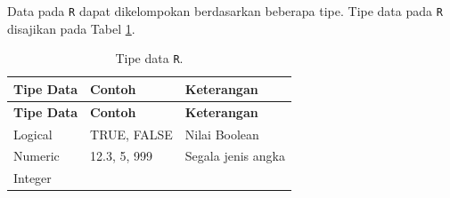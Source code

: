 \documentclass[]{book}
\theoremstyle{definition}
\theoremstyle{definition}
\theoremstyle{definition}
\theoremstyle{remark}
\begin{document}
Data pada \texttt{R} dapat dikelompokan berdasarkan beberapa tipe. Tipe data pada \texttt{R} disajikan pada Tabel \ref{tab:tipedata}.

\begin{longtable}[]{@{}lll@{}}
\caption{\label{tab:tipedata} Tipe data \texttt{R}.}\tabularnewline
\toprule
\begin{minipage}[b]{0.11\columnwidth}\raggedright
\textbf{Tipe Data}\strut
\end{minipage} & \begin{minipage}[b]{0.19\columnwidth}\raggedright
\textbf{Contoh}\strut
\end{minipage} & \begin{minipage}[b]{0.61\columnwidth}\raggedright
\textbf{Keterangan}\strut
\end{minipage}\tabularnewline
\midrule
\endfirsthead
\toprule
\begin{minipage}[b]{0.11\columnwidth}\raggedright
\textbf{Tipe Data}\strut
\end{minipage} & \begin{minipage}[b]{0.19\columnwidth}\raggedright
\textbf{Contoh}\strut
\end{minipage} & \begin{minipage}[b]{0.61\columnwidth}\raggedright
\textbf{Keterangan}\strut
\end{minipage}\tabularnewline
\midrule
\endhead
\begin{minipage}[t]{0.11\columnwidth}\raggedright
Logical\strut
\end{minipage} & \begin{minipage}[t]{0.19\columnwidth}\raggedright
TRUE, FALSE\strut
\end{minipage} & \begin{minipage}[t]{0.61\columnwidth}\raggedright
Nilai Boolean\strut
\end{minipage}\tabularnewline
\begin{minipage}[t]{0.11\columnwidth}\raggedright
Numeric\strut
\end{minipage} & \begin{minipage}[t]{0.19\columnwidth}\raggedright
12.3, 5, 999\strut
\end{minipage} & \begin{minipage}[t]{0.61\columnwidth}\raggedright
Segala jenis angka\strut
\end{minipage}\tabularnewline
\begin{minipage}[t]{0.11\columnwidth}\raggedright
Integer\strut
\end{minipage} & \begin{minipage}[t]{0.19\columnwidth}\raggedright

\end{minipage}
\end{longtable}
\end{document}
